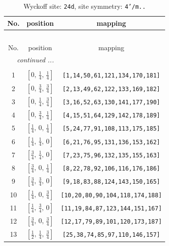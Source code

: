 \documentclass[fleqn,8pt]{jsarticle}
\begin{document}
\begin{longtable}{ccc}
\caption{Wyckoff site: {\tt 24d}, site symmetry: {\tt 4'/m..}}
 \\
 \hline \hline
No. & position & mapping \\ \hline \endfirsthead

\multicolumn{2}{l}{\tablename\ \thetable{}} \\
 \hline \hline
No. & position & mapping \\ \hline \endhead

 \hline \hline
\multicolumn{2}{r}{\footnotesize\it continued ...} \\ \endfoot

 \hline \hline
\multicolumn{2}{r}{} \\ \endlastfoot

1 & $\left[ 0,\, \frac{1}{4},\, \frac{1}{4} \right]$ & {\tt [1,14,50,61,121,134,170,181]} \\ \hline
2 & $\left[ 0,\, \frac{3}{4},\, \frac{3}{4} \right]$ & {\tt [2,13,49,62,122,133,169,182]} \\ \hline
3 & $\left[ 0,\, \frac{1}{4},\, \frac{3}{4} \right]$ & {\tt [3,16,52,63,130,141,177,190]} \\ \hline
4 & $\left[ 0,\, \frac{3}{4},\, \frac{1}{4} \right]$ & {\tt [4,15,51,64,129,142,178,189]} \\ \hline
5 & $\left[ \frac{1}{4},\, 0,\, \frac{1}{4} \right]$ & {\tt [5,24,77,91,108,113,175,185]} \\ \hline
6 & $\left[ \frac{1}{4},\, \frac{1}{4},\, 0 \right]$ & {\tt [6,21,76,95,131,136,153,162]} \\ \hline
7 & $\left[ \frac{3}{4},\, \frac{1}{4},\, 0 \right]$ & {\tt [7,23,75,96,132,135,155,163]} \\ \hline
8 & $\left[ \frac{3}{4},\, 0,\, \frac{1}{4} \right]$ & {\tt [8,22,78,92,106,116,176,186]} \\ \hline
9 & $\left[ \frac{3}{4},\, \frac{3}{4},\, 0 \right]$ & {\tt [9,18,83,88,124,143,150,165]} \\ \hline
10 & $\left[ \frac{1}{4},\, 0,\, \frac{3}{4} \right]$ & {\tt [10,20,80,90,104,118,174,188]} \\ \hline
11 & $\left[ \frac{1}{4},\, \frac{3}{4},\, 0 \right]$ & {\tt [11,19,84,87,123,144,151,167]} \\ \hline
12 & $\left[ \frac{3}{4},\, 0,\, \frac{3}{4} \right]$ & {\tt [12,17,79,89,101,120,173,187]} \\ \hline
13 & $\left[ \frac{1}{2},\, \frac{1}{4},\, \frac{3}{4} \right]$ & {\tt [25,38,74,85,97,110,146,157]} \\ \hline

\end{longtable}
\end{document}
